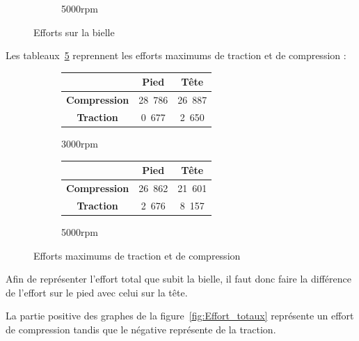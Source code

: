 \documentclass{article}
\begin{document}
\begin{figure}[h]
\begin{subfigure}[h]{0.45\textwidth}
                \caption{\unit{5000}{rpm}}
                \label{fig:forces_5000rpm}
    \end{subfigure}
    \caption{Efforts sur la bielle}
    \label{fig:EffortBielle}
\end{figure}


Les tableaux~\ref{fig:EffortMaxtrac} reprennent les efforts maximums de traction et de compression :

\begin{figure}[h]
\centering
    \begin{subfigure}[h]{0.45\textwidth}
    		\begin{tabular}{|c|c|c|}
		\hline 
  		& \textbf{Pied} & \textbf{Tête} \\ 
		\hline 
		\textbf{Compression} & \unit{28.786}{ \kilo\newton} & \unit{26.887}{\kilo\newton} \\ 
		\hline 
		\textbf{Traction} & \unit{0.677}{ \kilo\newton} & \unit{2.650}{ \kilo\newton} \\ 
		\hline 
		\end{tabular}
		\caption{\unit{3000}{rpm}}
		\label{fig:tab_forces_3000rpm}
    \end{subfigure}
    \begin{subfigure}[h]{0.45\textwidth}
        	\begin{tabular}{|c|c|c|}
		\hline 
  		& \textbf{Pied} & \textbf{Tête} \\ 
		\hline 
		\textbf{Compression} & \unit{26.862}{ \kilo\newton} & \unit{21.601}{ \kilo\newton}\\ 
		\hline 
		\textbf{Traction} & \unit{2.676}{ \kilo\newton} & \unit{8.157}{\kilo\newton} \\ 
		\hline 
		\end{tabular} 	
		\caption{\unit{5000}{rpm}}
		\label{fig:tab_forces_5000rpm}	
    \end{subfigure}
    \caption{Efforts maximums de traction et de compression}
    \label{fig:EffortMaxtrac}
\end{figure}

Afin de représenter l'effort total que subit la bielle, il faut donc faire la différence de l'effort sur le pied avec celui sur la tête.

La partie positive des graphes de la figure~\ref{fig:Effort_totaux} représente un effort de compression tandis que le négative représente de la traction.
\end{document}
